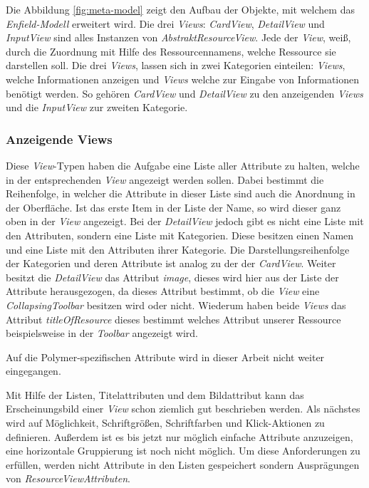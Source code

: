 Die Abbildung \ref{fig:meta-model} zeigt den Aufbau der Objekte, mit welchem das \textit{Enfield-Modell} erweitert wird. Die drei \textit{Views}: \textit{CardView}, \textit{DetailView} und \textit{InputView} sind alles Instanzen von \textit{AbstraktResourceView}. Jede der \textit{View}, weiß, durch die Zuordnung mit Hilfe des Ressourcennamens, welche Ressource sie darstellen soll. Die drei \textit{Views}, lassen sich in zwei Kategorien einteilen: \textit{Views}, welche Informationen anzeigen und \textit{Views} welche zur Eingabe von Informationen benötigt werden.
So gehören \textit{CardView} und \textit{DetailView} zu den anzeigenden \textit{Views} und die \textit{InputView} zur zweiten Kategorie. 

\subsubsection{Anzeigende Views}
Diese \textit{View}-Typen haben die Aufgabe eine Liste aller Attribute zu halten, welche in der entsprechenden \textit{View} angezeigt werden sollen. Dabei bestimmt die Reihenfolge, in welcher die Attribute in dieser Liste sind auch die Anordnung in der Oberfläche. Ist das erste Item in der Liste der Name, so wird dieser ganz oben in der \textit{View} angezeigt.
Bei der \textit{DetailView} jedoch gibt es nicht eine Liste mit den Attributen, sondern eine Liste mit Kategorien. Diese besitzen 
einen Namen und eine Liste mit den Attributen ihrer Kategorie. Die Darstellungsreihenfolge der Kategorien und deren Attribute ist analog zu der der \textit{CardView}. Weiter besitzt die \textit{DetailView} das Attribut \textit{image}, dieses wird hier aus der Liste der Attribute herausgezogen, da dieses Attribut bestimmt, ob die \textit{View} eine \textit{CollapsingToolbar} besitzen wird oder nicht. Wiederum haben beide \textit{Views} das Attribut \textit{titleOfResource} dieses bestimmt welches Attribut unserer Ressource beispielsweise in der \textit{Toolbar} angezeigt wird.

Auf die Polymer-spezifischen Attribute wird in dieser Arbeit nicht weiter eingegangen.

Mit Hilfe der Listen, Titelattributen und dem Bildattribut kann das Erscheinungsbild einer \textit{View} schon ziemlich gut beschrieben werden. Als nächstes wird auf Möglichkeit, Schriftgrößen, Schriftfarben und Klick-Aktionen zu definieren.
Außerdem ist es bis jetzt nur möglich einfache Attribute anzuzeigen, eine horizontale Gruppierung ist noch nicht möglich. Um diese Anforderungen zu erfüllen, werden nicht Attribute in den Listen gespeichert sondern Ausprägungen von \textit{ResourceViewAttributen}. 

